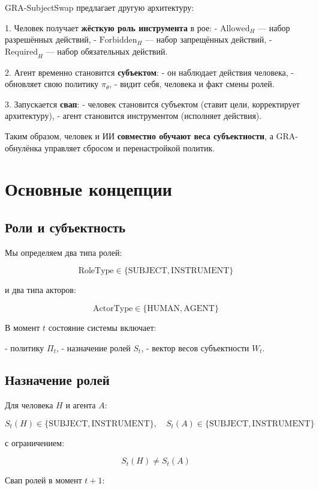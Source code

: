 \documentclass[11pt,a4paper]{article}
\begin{document}
GRA-SubjectSwap предлагает другую архитектуру:

1. Человек получает \textbf{жёсткую роль инструмента} в рое:
   - \(\text{Allowed}_H\) — набор разрешённых действий,
   - \(\text{Forbidden}_H\) — набор запрещённых действий,
   - \(\text{Required}_H\) — набор обязательных действий.

2. Агент временно становится \textbf{субъектом}:
   - он наблюдает действия человека,
   - обновляет свою политику \(\pi_\theta\),
   - видит себя, человека и факт смены ролей.

3. Запускается \textbf{свап}:
   - человек становится субъектом (ставит цели, корректирует архитектуру),
   - агент становится инструментом (исполняет действия).

Таким образом, человек и ИИ \textbf{совместно обучают веса субъектности}, а GRA-обнулёнка управляет сбросом и перенастройкой политик.

\section{Основные концепции}

\subsection{Роли и субъектность}

Мы определяем два типа ролей:

\[
\text{RoleType} \in \{ \text{SUBJECT}, \text{INSTRUMENT} \}
\]

и два типа акторов:

\[
\text{ActorType} \in \{ \text{HUMAN}, \text{AGENT} \}
\]

В момент \(t\) состояние системы включает:

- политику \(\Pi_t\),
- назначение ролей \(S_t\),
- вектор весов субъектности \(W_t\).

\subsection{Назначение ролей}

Для человека \(H\) и агента \(A\):

\[
S_t(H) \in \{ \text{SUBJECT}, \text{INSTRUMENT} \}, \quad
S_t(A) \in \{ \text{SUBJECT}, \text{INSTRUMENT} \}
\]

с ограничением:

\[
S_t(H) \neq S_t(A)
\]

Свап ролей в момент \(t+1\):
\end{document}
